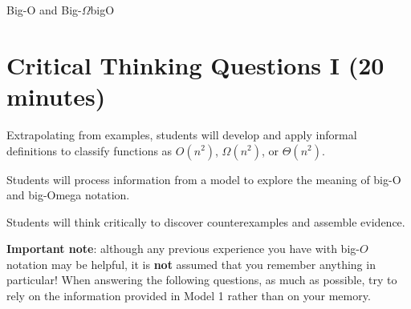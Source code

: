 \documentclass{tufte-handout}
\begin{document}
\begin{model}{Big-O and Big-$\Omega$}{bigO}
\begin{center}
\begin{minipage}{\textwidth}
\end{minipage}

\end{center}
\end{model}

\newpage
\section{Critical Thinking Questions I (20 minutes)}

\newcommand{\lobjectiveA}{Extrapolating from examples, students
  will develop and apply informal definitions to classify functions as
  $O(n^2)$, $\Omega(n^2)$, or $\Theta(n^2)$.}

\newcommand{\pobjectiveA}{Students will process information from a
  model to explore the meaning of big-O and big-Omega notation.}

\newcommand{\pobjectiveB}{Students will think critically to discover
  counterexamples and assemble evidence.}

\begin{objective}
  \lobjectiveA
\end{objective}

\begin{pobjective}
  \pobjectiveA
\end{pobjective}

\begin{pobjective}
  \pobjectiveB
\end{pobjective}

\textbf{Important note}: although any previous experience you have
with big-$O$ notation may be helpful, it is \textbf{not} assumed that
you remember anything in particular!  When answering the following
questions, as much as possible, try to rely on the information
provided in Model 1 rather than on your memory.
\end{document}
